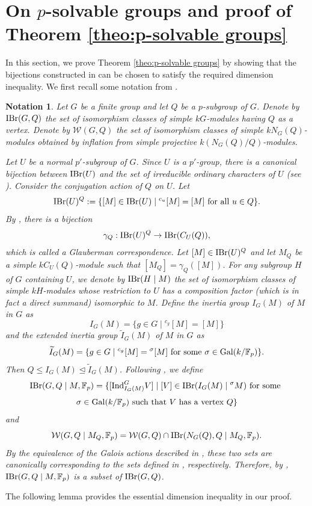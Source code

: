 \documentclass[preprint,12pt,3p]{elsarticle}
\newtheorem{notation}[theorem]{Notation}
\def\IBr{{\rm IBr}}
\def\Ind{{\rm Ind}}
\def\Gal{{\rm Gal}}
\def\W{\mathcal{W}}
\def\F{\mathbb{F}}
\begin{document}
\section{On $p$-solvable groups and proof of Theorem \ref{theo:p-solvable groups}}\label{s5}

In this section, we prove Theorem
\ref{theo:p-solvable groups} by showing that the
bijections constructed in \cite[Theorem 7.1]{Turull14}
can be chosen to satisfy the required dimension
inequality.
We first recall some notation from
\cite[Section 5]{Turull14}.

\begin{notation}
{\rm
Let $G$ be a finite group and let $Q$ be a
$p$-subgroup of $G$. Denote by $\IBr(G,Q)$ the
set of isomorphism classes of simple $kG$-modules
having $Q$ as a vertex.
Denote by $\W(G,Q)$ the set of isomorphism classes of simple $k N_G(Q)$-modules obtained
by inflation from simple projective
$k(N_G(Q)/Q)$-modules.

Let $U$ be a normal $p'$-subgroup of $G$.
Since $U$ is a $p'$-group, there is a canonical bijection between $\IBr(U)$ and the set of irreducible ordinary characters of $U$ (see \cite[Theorem 2.12]{Navarro}). Consider the conjugation action of $Q$ on $U$. Let 
$$\IBr(U)^Q:=\{[M]\in \IBr(U)\mid {}^{c_u}[M]=[M]~{\rm for~all}~u\in Q\}.$$ 
By \cite[Theorem 2.9]{Navarro2018}, there is a bijection 
$$\gamma_Q:\IBr(U)^Q\to \IBr(C_U(Q)),$$ which is called a {\it Glauberman correspondence}. Let $[M]\in \IBr(U)^Q$ and let $M_Q$ be a simple
$kC_U(Q)$-module such that $[M_Q] = \gamma_Q ([M])$.
For any subgroup $H$ of $G$ containing $U$,
we denote by $\IBr(H\mid M)$ the set of
isomorphism classes of simple $kH$-modules
whose restriction to $U$ has a composition factor (which is in fact a direct summand) isomorphic to $M$.
Define the {\it inertia group} $I_G(M)$ of $M$ in $G$ as
$$I_G(M) = \{g\in G \mid {}^{c_g}[M]=[M]\}$$
and the {\it extended inertia group} $\widetilde{I}_G(M)$ of $M$ in $G$ as 
$$\widetilde{I}_G(M) = \{g\in G\mid {}^{c_g}[M]={}^{\sigma}[M]
\text{ for some }\sigma\in\Gal(k/\F_p)\}.$$
Then $Q\leq I_G(M) \unlhd \widetilde{I}_G(M)$.
Following \cite[Definitions 5.5 and 5.6]{Turull14},
we define
$$\IBr(G,Q\mid M,\F_p) = \{ [\Ind_{I_G(M)}^G V] \mid [V]\in\IBr(I_G(M) \mid {}^{\sigma} M)~\text{for some }$$ 
$$\sigma\in \Gal(k/\F_p)~\text{such that}~V~\text{has a vertex}~Q\}$$
and
\[
\W(G,Q\mid M_Q,\F_p) = \W(G,Q) \cap \IBr(N_G(Q),Q \mid M_Q , \mathbb{F}_p).
\]
By the equivalence of the Galois actions described
in \cite[\S 2 (2")]{Turull14}, these two sets are canonically corresponding to the sets defined in \cite[Definitions 5.5 and 5.6]{Turull14}, respectively.
Therefore, by \cite[Lemma 4.1]{Turull14}, $\IBr(G,Q\mid M,\F_p)$ is a subset of $\IBr(G,Q)$.
}
\end{notation}
The following lemma provides the essential
dimension inequality in our proof. 
\end{document}
